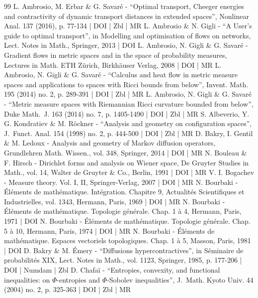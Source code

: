 \begin{thebibliography}{99}
L. Ambrosio, M. Erbar \& G. Savaré - “Optimal transport, Cheeger energies and contractivity of dynamic transport distances in extended spaces”, Nonlinear Anal. 137 (2016), p. 77-134 | DOI | Zbl | MR
L. Ambrosio \& N. Gigli - “A User’s guide to optimal transport”, in Modelling and optimisation of flows on networks, Lect. Notes in Math., Springer, 2013 | DOI
L. Ambrosio, N. Gigli \& G. Savaré - Gradient flows in metric spaces and in the space of probability measures, Lectures in Math. ETH Zürich, Birkhäuser Verlag, 2008 | DOI | MR
L. Ambrosio, N. Gigli \& G. Savaré - “Calculus and heat flow in metric measure spaces and applications to spaces with Ricci bounds from below”, Invent. Math. 195 (2014) no. 2, p. 289-391 | DOI | Zbl | MR
L. Ambrosio, N. Gigli \& G. Savaré - “Metric measure spaces with Riemannian Ricci curvature bounded from below”, Duke Math. J. 163 (2014) no. 7, p. 1405-1490 | DOI | Zbl | MR
S. Albeverio, Y. G. Kondratiev \& M. Röckner - “Analysis and geometry on configuration spaces”, J. Funct. Anal. 154 (1998) no. 2, p. 444-500 | DOI | Zbl | MR
D. Bakry, I. Gentil \& M. Ledoux - Analysis and geometry of Markov diffusion operators, Grundlehren Math. Wissen., vol. 348, Springer, 2014 | DOI | MR
N. Bouleau \& F. Hirsch - Dirichlet forms and analysis on Wiener space, De Gruyter Studies in Math., vol. 14, Walter de Gruyter \& Co., Berlin, 1991 | DOI | MR
V. I. Bogachev - Measure theory. Vol. I, II, Springer-Verlag, 2007 | DOI | MR
N. Bourbaki - Éléments de mathématique. Intégration. Chapitre 9, Actualités Scientifiques et Industrielles, vol. 1343, Hermann, Paris, 1969 | DOI | MR
N. Bourbaki - Éléments de mathématique. Topologie générale. Chap. 1 à 4, Hermann, Paris, 1971 | DOI
N. Bourbaki - Éléments de mathématique. Topologie générale. Chap. 5 à 10, Hermann, Paris, 1974 | DOI | MR
N. Bourbaki - Éléments de mathématique. Espaces vectoriels topologiques. Chap. 1 à 5, Masson, Paris, 1981 | DOI
D. Bakry \& M. Émery - “Diffusions hypercontractives”, in Séminaire de probabilités XIX, Lect. Notes in Math., vol. 1123, Springer, 1985, p. 177-206 | DOI | Numdam | Zbl
D. Chafaï - “Entropies, convexity, and functional inequalities: on $\Phi $-entropies and $\Phi $-Sobolev inequalities”, J. Math. Kyoto Univ. 44 (2004) no. 2, p. 325-363 | DOI | Zbl | MR

\end{thebibliography}
